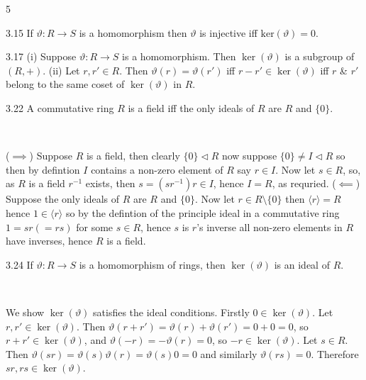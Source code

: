 \documentclass[8pt]{extarticle}
\makeatletter
\renewenvironment{proof}[1][\proofname]{%
  \par\noindent
  \pushQED{\qed}%
  \normalfont\itshape #1\@addpunct{.}\ \normalfont\ignorespaces
}{%
  \popQED%
  \par
}
\makeatother
\begin{document}
\begin{multicols}{5}
        \begin{lemma}{3.15}
            If \(\vartheta: R\to S\) is a homomorphism then \(\vartheta\) is injective iff \(\text{ker}(\vartheta)={0}\).
        \end{lemma}

        \begin{lemma}{3.17}
            (i) Suppose \(\vartheta:R\to S\) is a homomorphism. Then \(\ker(\vartheta)\) is a subgroup of \((R,+)\). (ii) Let \(r,r'\in R\). Then \(\vartheta(r)=\vartheta(r')\) iff \(r-r'\in\ker(\vartheta)\) iff \(r\) \& \(r'\) belong to the same coset of \(\ker(\vartheta)\) in \(R\).
        \end{lemma}

        \begin{proposition}{3.22}
            A commutative ring \(R\) is a field iff the only ideals of \(R\) are \(R\) and \(\{0\}\).
        \end{proposition}

        \begin{proof}
            (\(\implies\)) Suppose \(R\) is a field, then clearly \(\{0\}\lhd R\) now suppose \(\{0\}\ne I\lhd R\) so then by defintion \(I\) contains a non-zero element of \(R\) say \(r\in I\). Now let \(s\in R\), so, as \(R\) is a field \(r^{-1}\) exists, then \(s=(sr^{-1})r\in I\), hence \(I=R\), as requried.
            (\(\impliedby\)) Suppose the only ideals of \(R\) are \(R\) and \(\{0\}\). Now let \(r\in R\setminus\{0\}\) then \(\langle r\rangle=R\) hence \(1\in\langle r\rangle\) so by the defintion of the principle ideal in a commutative ring \(1=sr(=rs)\) for some \(s\in R\), hence \(s\) is \(r\)'s inverse all non-zero elements in \(R\) have inverses, hence \(R\) is a field.
        \end{proof}

        \begin{proposition}{3.24}
            If \(\vartheta:R\to S\) is a homomorphism of rings, then \(\ker(\vartheta)\) is an ideal of \(R\).
        \end{proposition}

        \begin{proof}
            We show \(\ker(\vartheta)\) satisfies the ideal conditions. Firstly \(0\in\ker(\vartheta)\). Let \(r,r'\in\ker(\vartheta)\). Then \(\vartheta(r+r')=\vartheta(r)+\vartheta(r')=0+0=0\), so \(r+r'\in\ker(\vartheta)\), and \(\vartheta(-r)=-\vartheta(r)=0\), so \(-r\in\ker(\vartheta)\). Let \(s\in R\). Then \(\vartheta(sr)=\vartheta(s)\vartheta(r)=\vartheta(s)0=0\) and similarly \(\vartheta(rs)=0\). Therefore \(sr,rs\in\ker(\vartheta)\).
        \end{proof}


\end{multicols}
\end{document}
